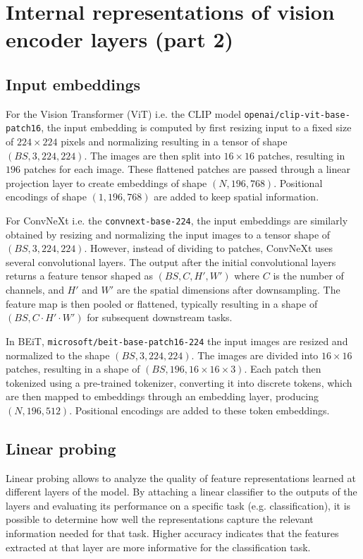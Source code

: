 \documentclass[
  11pt,
  a4paper,
  onecolumn]{article}
\begin{document}
\section{Internal representations of vision encoder layers (part 2)}\label{part_2}

\subsection{Input embeddings}

For the Vision Transformer (ViT) i.e. the CLIP model \texttt{openai/clip-vit-base-patch16}, the input embedding is computed by first resizing input to a fixed size of $224 \times 224$ pixels and normalizing resulting in a tensor of shape $(BS, 3, 224, 224)$. The images are then split into $16 \times 16$ patches, resulting in $196$ patches for each image. These flattened patches are passed through a linear projection layer to create embeddings of shape $(N, 196, 768)$. Positional encodings of shape $(1, 196, 768)$ are added to keep spatial information.

For ConvNeXt i.e. the \texttt{convnext-base-224}, the input embeddings are similarly obtained by resizing and normalizing the input images to a tensor shape of $(BS, 3, 224, 224)$. However, instead of dividing to patches, ConvNeXt uses several convolutional layers. The output after the initial convolutional layers returns a feature tensor shaped as $(BS, C, H', W')$ where $C$ is the number of channels, and $H'$ and $W'$ are the spatial dimensions after downsampling. The feature map is then pooled or flattened, typically resulting in a shape of $(BS, C \cdot H' \cdot W')$ for subsequent downstream tasks.

In BEiT, \texttt{microsoft/beit-base-patch16-224} the input images are resized and normalized to the shape $(BS, 3, 224, 224)$. The images are divided into $16 \times 16$ patches, resulting in a shape of $(BS, 196, 16 \times 16 \times 3)$. Each patch then tokenized using a pre-trained tokenizer, converting it into discrete tokens, which are then mapped to embeddings through an embedding layer, producing $(N, 196, 512)$. Positional encodings are added to these token embeddings.


\subsection{Linear probing}
Linear probing allows to analyze the quality of feature representations learned at different layers of the model. By attaching a linear classifier to the outputs of the layers and evaluating its performance on a specific task (e.g. classification), it is possible to determine how well the representations capture the relevant information needed for that task. Higher accuracy indicates that the features extracted at that layer are more informative for the classification task.
\end{document}
